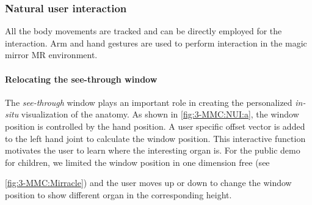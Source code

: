 {{\subsubsection{Natural user interaction}
All the body movements are tracked and can be directly employed for the interaction. Arm and hand gestures are used to perform interaction in the magic mirror MR environment.

\paragraph{Relocating the see-through window}
The \textit{see-through} window plays an important role in creating the personalized \textit{in-situ} visualization of the anatomy.
As shown in \figurename{\ref{fig:3-MMC:NUI:a}}, the window position is controlled by the hand position. A user specific offset vector is added to the left hand joint to calculate the window position. This interactive function motivates the user to learn where the interesting organ is. For the public demo for children, we limited the window position in one dimension free (see \figurename{\ref{fig:3-MMC:Mirracle}) and the user moves up or down to change the window position to show different organ in the corresponding height.
	
}}}
